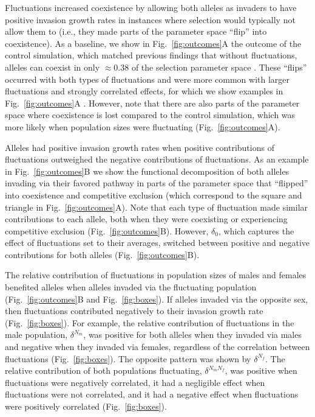 \documentclass[12pt]{article}
\begin{document}
Fluctuations increased coexistence by allowing both alleles as invaders to have positive invasion growth rates in instances where selection would typically not allow them to (i.e., they made parts of the parameter space ``flip'' into coexistence).  As a baseline, we show in Fig.~\ref{fig:outcomes}A the outcome of the control simulation, which matched previous findings that without fluctuations, alleles can coexist in only $\approx 0.38$ of the selection parameter space \citep{connallon2018environmental}. These ``flips'' occurred with both types of fluctuations and were more common with larger fluctuations and strongly correlated effects, for which we show examples in Fig.~\ref{fig:outcomes}A . However, note that there are also parts of the parameter space where coexistence is lost compared to the control simulation, which was more likely when population sizes were fluctuating (Fig.~\ref{fig:outcomes}A).

Alleles had positive invasion growth rates when positive contributions of fluctuations outweighed the negative contributions of fluctuations. As an example in Fig.~\ref{fig:outcomes}B we show the functional decomposition of both alleles invading via their favored pathway in parts of the parameter space that ``flipped'' into coexistence and competitive exclusion (which correspond to the square and triangle in Fig.~\ref{fig:outcomes}A). Note that each type of fluctuation made similar contributions to each allele, both when they were coexisting or experiencing competitive exclusion (Fig.~\ref{fig:outcomes}B). However, $\delta_{0}$, which captures the effect of fluctuations set to their averages, switched between positive and negative contributions for both alleles (Fig.~\ref{fig:outcomes}B).

The relative contribution of fluctuations in population sizes of males and females benefited alleles when alleles invaded via the fluctuating population (Fig.~\ref{fig:outcomes}B and Fig.~\ref{fig:boxes}). If alleles invaded via the opposite sex, then fluctuations contributed negatively to their invasion growth rate  (Fig.~\ref{fig:boxes}). For example, the relative contribution of fluctuations in the male population, $\delta^{N_{m}}$, was positive for both alleles when they invaded via males and negative when they invaded via females, regardless of the correlation between fluctuations (Fig.~\ref{fig:boxes}). The opposite pattern was shown by $\delta^{N_{f}}$. The relative contribution of both populations fluctuating,  $\delta^{N_{m}N_{f}}$, was positive when fluctuations were negatively correlated, it had a negligible effect when fluctuations were not correlated, and it had a negative effect when fluctuations were positively correlated (Fig.~\ref{fig:boxes}).
\end{document}
